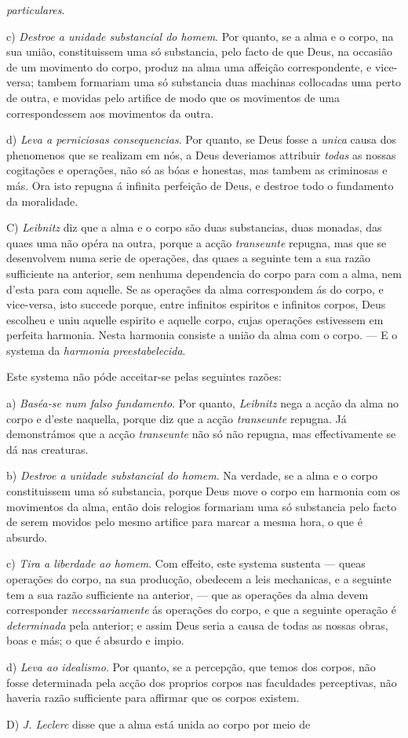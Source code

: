 \emph{particulares}.\par c) \emph{Destroe a unidade substancial do homem}. Por quanto, se a alma e o corpo, na sua união, constituissem uma só substancia, pelo facto de que Deus, na occasião de um movimento do corpo, produz na alma uma affeição correspondente, e vice-versa; tambem formariam uma só substancia duas machinas collocadas uma perto de outra, e movidas pelo artifice de modo que os movimentos de uma correspondessem aos movimentos da outra.\par d) \emph{Leva a perniciosas consequencias}. Por quanto, se Deus fosse a \emph{unica} causa dos phenomenos que se realizam em nós, a Deus deveriamos attribuir \emph{todas} as nossas cogitações e operações, não só as bóas e honestas, mas tambem as criminosas e más. Ora isto repugna á infinita perfeição de Deus, e destroe todo o fundamento da moralidade.\par C) \emph{Leibnitz} diz que a alma e o corpo são duas substancias, duas monadas, das quaes uma não opéra na outra, porque a acção \emph{transeunte} repugna, mas que se desenvolvem numa serie de operações, das quaes a seguinte tem a sua razão sufficiente na anterior, sem nenhuma dependencia do corpo para com a alma, nem d'esta para com aquelle. Se as operações da alma correspondem ás do corpo, e vice-versa, isto succede porque, entre infinitos espiritos e infinitos corpos, Deus escolheu e uniu aquelle espirito e aquelle corpo, cujas operações estivessem em perfeita harmonia. Nesta harmonia consiste a união da alma com o corpo. --- E o systema da \emph{harmonia preestabelecida}.\par Este systema não póde acceitar-se pelas seguintes razões:\par a) \emph{Baséa-se num falso fundamento}. Por quanto, \emph{Leibnitz} nega a acção da alma no corpo e d'este naquella, porque diz que a acção \emph{transeunte} repugna. Já demonstrámos que a acção \emph{transeunte} não só não repugna, mas effectivamente se dá nas creaturas.\par b) \emph{Destroe a unidade substancial do homem}. Na verdade, se a alma e o corpo constituissem uma só substancia, porque Deus move o corpo em harmonia com os movimentos da alma, então dois relogios formariam uma só substancia pelo facto de serem movidos pelo mesmo artifice para marcar a mesma hora, o que é absurdo.\par c) \emph{Tira a liberdade ao homem}. Com effeito, este systema sustenta --- queas operações do corpo, na sua producção, obedecem a leis mechanicas, e a seguinte tem a sua razão sufficiente na anterior, --- que as operações da alma devem corresponder \emph{necessariamente} ás operações do corpo, e que a seguinte operação é \emph{determinada} pela anterior; e assim Deus seria a causa de todas as nossas obras, boas e más; o que é absurdo e impio.\par d) \emph{Leva ao idealismo}. Por quanto, se a percepção, que temos dos corpos, não fosse determinada pela acção dos proprios corpos nas faculdades perceptivas, não haveria razão sufficiente para affirmar que os corpos existem.\par D) \emph{J. Leclerc} disse que a alma está unida ao corpo por meio de 